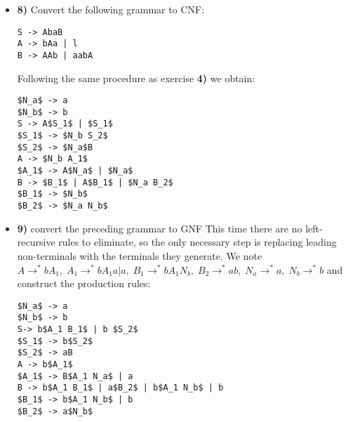 \documentclass[defaultpackages]{simplereport}
\newcommand{\gen}{\rightarrow^*}
\begin{document}
\begin{itemize}[label=]
   \item \textbf{8)} Convert the following grammar to CNF:
     \begin{lstlisting}
S -> AbaB
A -> bAa | l
B -> AAb | aabA
\end{lstlisting}
     Following the same procedure as exercise \textbf{4)} we obtain:
     \begin{lstlisting}
$N_a$ -> a
$N_b$ -> b
S -> A$S_1$ | $S_1$
$S_1$ -> $N_b S_2$
$S_2$ -> $N_a$B
A -> $N_b A_1$
$A_1$ -> A$N_a$ | $N_a$
B -> $B_1$ | A$B_1$ | $N_a B_2$
$B_1$ -> $N_b$
$B_2$ -> $N_a N_b$
\end{lstlisting}

   \item \textbf{9)} convert the preceding grammar to GNF
     This time there are no left-recursive rules to eliminate, so the only
     necessary step is replacing leading non-terminals with the terminals they
     generate. We note $A \gen bA_1, \; A_1 \gen b A_1 a | a, \; B_1 \gen
     bA_1N_b, \;B_2 \gen ab,\; N_a \gen a, \; N_b \gen b$ and construct the production rules:
     \begin{lstlisting}
$N_a$ -> a
$N_b$ -> b
S-> b$A_1 B_1$ | b $S_2$
$S_1$ -> b$S_2$
$S_2$ -> aB
A -> b$A_1$
$A_1$ -> B$A_1 N_a$ | a
B -> b$A_1 B_1$ | a$B_2$ | b$A_1 N_b$ | b
$B_1$ -> b$A_1 N_b$ | b
$B_2$ -> a$N_b$
\end{lstlisting}
   \end{itemize}
\end{document}
